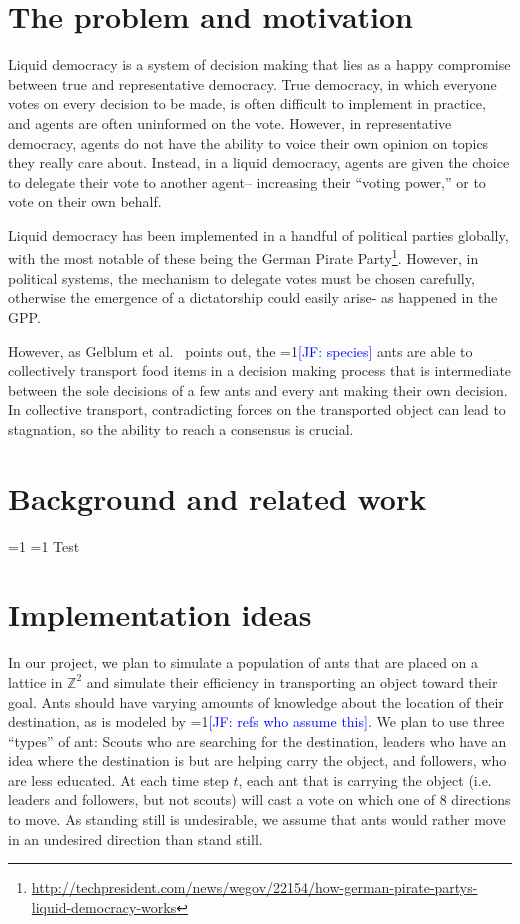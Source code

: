 \documentclass[12pt]{article}
\newcommand{\Comments}{1}
\newcommand{\mynote}[2]{\ifnum\Comments=1\textcolor{#1}{#2}\fi}
\newcommand{\mytodo}[2]{\ifnum\Comments=1%
	\todo[linecolor=#1!80!black,backgroundcolor=#1,bordercolor=#1!80!black]{#2}\fi}
\newcommand{\jessie}[1]{\mynote{blue}{[JF: #1]}}
\newcommand{\jessiet}[1]{\mytodo{blue!20!white}{JF: #1}}
\newcommand{\gabet}[1]{\mytodo{purple!20!white}{GA: #1}}
\begin{document}

\section{The problem and motivation}
Liquid democracy is a system of decision making that lies as a happy compromise between true and representative democracy.
True democracy, in which everyone votes on every decision to be made, is often difficult to implement in practice, and agents are often uninformed on the vote.
However, in representative democracy, agents do not have the ability to voice their own opinion on topics they really care about.
Instead, in a liquid democracy, agents are given the choice to delegate their vote to another agent-- increasing their ``voting power,'' or to vote on their own behalf.


Liquid democracy has been implemented in a handful of political parties globally, with the most notable of these being the German Pirate Party\footnote{\url{http://techpresident.com/news/wegov/22154/how-german-pirate-partys-liquid-democracy-works}}.
However, in political systems, the mechanism to delegate votes must be chosen carefully, otherwise the emergence of a dictatorship could easily arise- as happened in the GPP.

However, as Gelblum et al.~\cite{gelblum2015ant} points out, the \jessie{species} ants are able to collectively transport food items in a decision making process that is intermediate between the sole decisions of a few ants and every ant making their own decision.
In collective transport, contradicting forces on the transported object can lead to stagnation, so the ability to reach a consensus is crucial.

\section{Background and related work}
\jessiet{Add in lit review}
\gabet{Add in lit review}
Test

\section{Implementation ideas}
In our project, we plan to simulate a population of ants that are placed on a lattice in $\mathbb{Z}^2$ and simulate their efficiency in transporting an object toward their goal.
Ants should have varying amounts of knowledge about the location of their destination, as is modeled by \jessie{refs who assume this}.
We plan to use three ``types'' of ant: Scouts who are searching for the destination, leaders who have an idea where the destination is but are helping carry the object, and followers, who are less educated.
At each time step $t$, each ant that is carrying the object (i.e. leaders and followers, but not scouts) will cast a vote on which one of 8 directions to move.
As standing still is undesirable, we assume that ants would rather move in an undesired direction than stand still.
\end{document}
